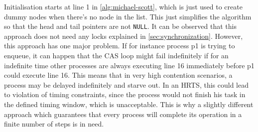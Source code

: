 Initialisation starts at line 1 in \cref{alg:michael-scott}, which is just used to create dummy nodes when there's no node in the list. This just simplifies the algorithm so that the head and tail pointers are not \texttt{NULL}. It can be observed that this approach does not need any locks explained in \cref{sec:synchronization}. However, this approach has one major problem. If for instance process p1 is trying to enqueue, it can happen that the \ac{CAS} loop might fail indefinitely if for an indefinite time other processes are always executing line 16 immediately before p1 could execute line 16. This means that in very high contention scenarios, a process may be delayed indefinitely and starve out. In an \ac{HRTS}, this could lead to violation of timing constraints, since the process would not finish his task in the defined timing window, which is unacceptable. This is why a slightly different approach which guarantees that every process will complete its operation in a finite number of steps is in need. \cite{MichaelScottQueue}

